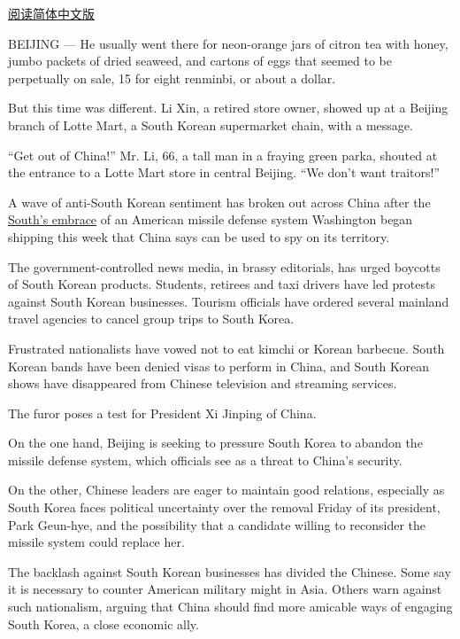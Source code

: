 \href{http://cn.nytimes3xbfgragh.onion/china/20170310/china-lotte-thaad-south-korea/}{阅读简体中文版}

BEIJING --- He usually went there for neon-orange jars of citron tea
with honey, jumbo packets of dried seaweed, and cartons of eggs that
seemed to be perpetually on sale, 15 for eight renminbi, or about a
dollar.

But this time was different. Li Xin, a retired store owner, showed up at
a Beijing branch of Lotte Mart, a South Korean supermarket chain, with a
message.

``Get out of China!'' Mr. Li, 66, a tall man in a fraying green parka,
shouted at the entrance to a Lotte Mart store in central Beijing. ``We
don't want traitors!''

A wave of anti-South Korean sentiment has broken out across China after
the
\href{https://www.nytimes3xbfgragh.onion/2017/03/06/world/asia/north-korea-thaad-missile-defense-us-china.html}{South's
embrace} of an American missile defense system Washington began shipping
this week that China says can be used to spy on its territory.

The government-controlled news media, in brassy editorials, has urged
boycotts of South Korean products. Students, retirees and taxi drivers
have led protests against South Korean businesses. Tourism officials
have ordered several mainland travel agencies to cancel group trips to
South Korea.

Frustrated nationalists have vowed not to eat kimchi or Korean barbecue.
South Korean bands have been denied visas to perform in China, and South
Korean shows have disappeared from Chinese television and streaming
services.

The furor poses a test for President Xi Jinping of China.

On the one hand, Beijing is seeking to pressure South Korea to abandon
the missile defense system, which officials see as a threat to China's
security.

On the other, Chinese leaders are eager to maintain good relations,
especially as South Korea faces political uncertainty over the removal
Friday of its president, Park Geun-hye, and the possibility that a
candidate willing to reconsider the missile system could replace her.

The backlash against South Korean businesses has divided the Chinese.
Some say it is necessary to counter American military might in Asia.
Others warn against such nationalism, arguing that China should find
more amicable ways of engaging South Korea, a close economic ally.

